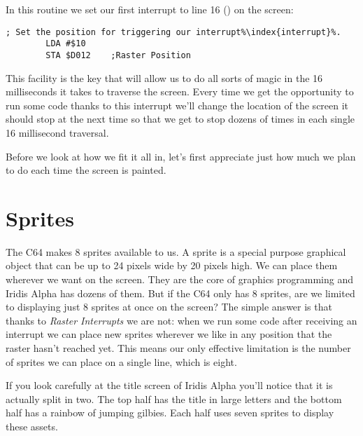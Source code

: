 In this routine we set our first interrupt to line 16 () on the screen:

\begin{lstlisting}[caption=In \icode{InitializeSpritesAndInterruptsForTitleScreen\index{InitializeSpritesAndInterruptsForTitleScreen}},escapechar=\%]
        ; Set the position for triggering our interrupt%\index{interrupt}%.
        LDA #$10
        STA $D012    ;Raster Position
\end{lstlisting}

This facility is the key that will allow us to do all sorts of magic in the 16 milliseconds
it takes to traverse the screen. Every time we get the opportunity to run some code thanks
to this interrupt we'll change the location of the screen it should stop at the next time
so that we get to stop dozens of times in each single 16 millisecond traversal.

Before we look at how we fit it all in, let's first appreciate just how much we plan to
do each time the screen is painted.

\section{Sprites}
The C64 makes 8 sprites available to us. A sprite is a special purpose graphical object that
can be up to 24 pixels wide by 20 pixels high. We can place them wherever we want on the
screen. They are the core of graphics programming and Iridis Alpha has dozens of them. But
if the C64 only has 8 sprites, are we limited to displaying just 8 sprites at once on the
screen? The simple answer is that thanks to \textit{Raster Interrupts} we are not: when we run
some code after receiving an interrupt we can place new sprites wherever we like in any
position that the raster hasn't reached yet. This means our only effective limitation is
the number of sprites we can place on a single line, which is eight. 

If you look carefully at the title screen of Iridis Alpha you'll notice that it is actually
split in two. The top half has the title in large letters and the bottom half has a rainbow
of jumping gilbies. Each half uses seven sprites to display these assets.


